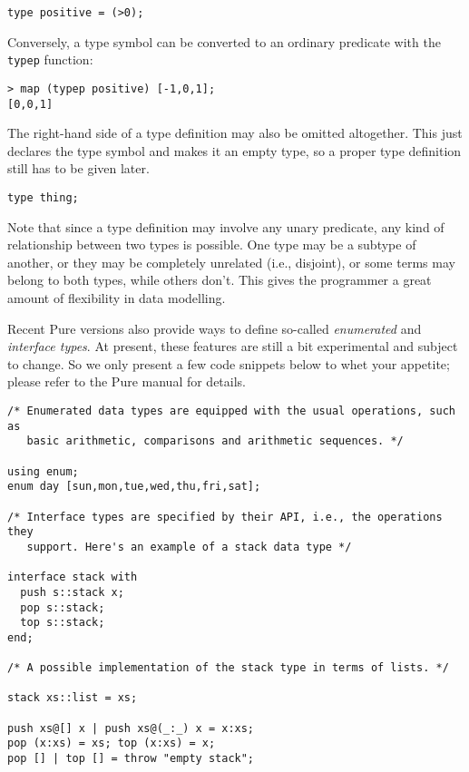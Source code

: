 \documentclass[a4paper,12pt]{article}
\begin{document}
\begin{lstlisting}
type positive = (>0);
\end{lstlisting}

Conversely, a type symbol can be converted to an ordinary predicate with the \verb|typep| function:

\begin{lstlisting}
> map (typep positive) [-1,0,1];
[0,0,1]
\end{lstlisting}

The right-hand side of a type definition may also be omitted altogether. This just declares the type symbol and makes it an empty type, so a proper type definition still has to be given later.

\begin{lstlisting}
type thing;
\end{lstlisting}

Note that since a type definition may involve any unary predicate, any kind of relationship between two types is possible. One type may be a subtype of another, or they may be completely unrelated (i.e., disjoint), or some terms may belong to both types, while others don't. This gives the programmer a great amount of flexibility in data modelling.

Recent Pure versions also provide ways to define so-called \emph{enumerated} and \emph{interface types}. At present, these features are still a bit experimental and subject to change. So we only present a few code snippets below to whet your appetite; please refer to the Pure manual for details.

\begin{lstlisting}
/* Enumerated data types are equipped with the usual operations, such as
   basic arithmetic, comparisons and arithmetic sequences. */

using enum;
enum day [sun,mon,tue,wed,thu,fri,sat];

/* Interface types are specified by their API, i.e., the operations they
   support. Here's an example of a stack data type */

interface stack with
  push s::stack x;
  pop s::stack;
  top s::stack;
end;

/* A possible implementation of the stack type in terms of lists. */

stack xs::list = xs;

push xs@[] x | push xs@(_:_) x = x:xs;
pop (x:xs) = xs; top (x:xs) = x;
pop [] | top [] = throw "empty stack";
\end{lstlisting}
\end{document}
